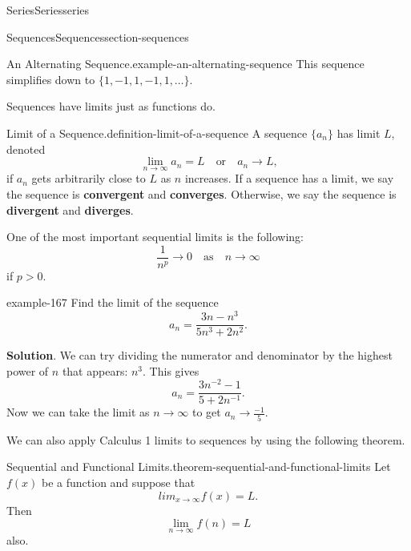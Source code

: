 \documentclass[oneside,10pt,]{book}
\newcommand{\terminology}[1]{\textbf{#1}}
\numberwithin{equation}{section}
\begin{document}
\begin{chapterptx}{Series}{}{Series}{}{}{series}
\begin{sectionptx}{Sequences}{}{Sequences}{}{}{section-sequences}
\begin{example}{An Alternating Sequence.}{example-an-alternating-sequence}
This sequence simplifies down to \(\{1, -1, 1, -1, 1, \ldots\}\).%
\end{example}
\hypertarget{p-790}{}%
Sequences have limits just as functions do.%
\begin{definition}{Limit of a Sequence.}{definition-limit-of-a-sequence}%
\hypertarget{p-791}{}%
A sequence \(\{a_{n}\}\) has limit \(L\), denoted%
\begin{equation*}
\lim_{n\to\infty}a_{n} = L \quad \text{or} \quad a_{n}\to L\text{,}
\end{equation*}
if \(a_{n}\) gets arbitrarily close to \(L\) as \(n\) increases. If a sequence has a limit, we say the sequence is \terminology{convergent} and \terminology{converges}. Otherwise, we say the sequence is \terminology{divergent} and \terminology{diverges}.%
\end{definition}
\hypertarget{p-792}{}%
One of the most important sequential limits is the following:%
\begin{equation*}
\frac{1}{n^{p}}\to 0\quad\text{as}\quad n\to\infty
\end{equation*}
if \(p > 0\).%
\begin{example}{}{example-167}%
\hypertarget{p-793}{}%
Find the limit of the sequence%
\begin{equation*}
a_{n} = \frac{3n - n^{3}}{5n^{3} + 2n^{2}}.
\end{equation*}
%
\par\smallskip%
\noindent\textbf{Solution}.\hypertarget{solution-163}{}\quad%
\hypertarget{p-794}{}%
We can try dividing the numerator and denominator by the highest power of \(n\) that appears: \(n^{3}\). This gives%
\begin{equation*}
a_{n} = \frac{3n^{-2} - 1}{5 + 2n^{-1}}\text{.}
\end{equation*}
Now we can take the limit as \(n\to\infty\) to get \(a_{n}\to\frac{-1}{5}\).%
\end{example}
\hypertarget{p-795}{}%
We can also apply Calculus 1 limits to sequences by using the following theorem.%
\begin{theorem}{Sequential and Functional Limits.}{}{theorem-sequential-and-functional-limits}%
\hypertarget{p-796}{}%
Let \(f(x)\) be a function and suppose that%
\begin{equation*}
lim_{x\to\infty}f(x) = L\text{.}
\end{equation*}
Then%
\begin{equation*}
\lim_{n\to\infty}f(n) = L
\end{equation*}
also.%
\end{theorem}

\end{sectionptx}
\end{chapterptx}
\end{document}
